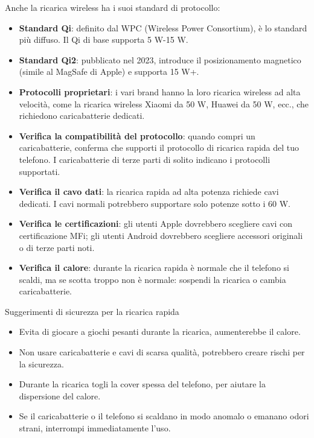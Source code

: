 Anche la ricarica wireless ha i suoi standard di protocollo:

\begin{itemize}
  \item \textbf{Standard Qi}: definito dal WPC (Wireless Power Consortium), è lo standard più diffuso. Il Qi di base supporta 5 W-15 W.
  \item \textbf{Standard Qi2}: pubblicato nel 2023, introduce il posizionamento magnetico (simile al MagSafe di Apple) e supporta 15 W+.
  \item \textbf{Protocolli proprietari}: i vari brand hanno la loro ricarica wireless ad alta velocità, come la ricarica wireless Xiaomi da 50 W, Huawei da 50 W, ecc., che richiedono caricabatterie dedicati.
\end{itemize}


\begin{itemize}
  \item \textbf{Verifica la compatibilità del protocollo}: quando compri un caricabatterie, conferma che supporti il protocollo di ricarica rapida del tuo telefono. I caricabatterie di terze parti di solito indicano i protocolli supportati.
  \item \textbf{Verifica il cavo dati}: la ricarica rapida ad alta potenza richiede cavi dedicati. I cavi normali potrebbero supportare solo potenze sotto i 60 W.
  \item \textbf{Verifica le certificazioni}: gli utenti Apple dovrebbero scegliere cavi con certificazione MFi; gli utenti Android dovrebbero scegliere accessori originali o di terze parti noti.
  \item \textbf{Verifica il calore}: durante la ricarica rapida è normale che il telefono si scaldi, ma se scotta troppo non è normale: sospendi la ricarica o cambia caricabatterie.
\end{itemize}

\begin{tcbwarn}{Suggerimenti di sicurezza per la ricarica rapida}
\begin{itemize}
  \item Evita di giocare a giochi pesanti durante la ricarica, aumenterebbe il calore.
  \item Non usare caricabatterie e cavi di scarsa qualità, potrebbero creare rischi per la sicurezza.
  \item Durante la ricarica togli la cover spessa del telefono, per aiutare la dispersione del calore.
  \item Se il caricabatterie o il telefono si scaldano in modo anomalo o emanano odori strani, interrompi immediatamente l'uso.
\end{itemize}

\end{tcbwarn}

